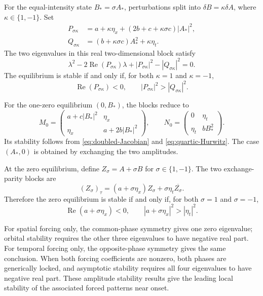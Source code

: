 For the equal-intensity state $B_*=\sigma A_*$, perturbations split into
$\delta B=\kappa\delta A$, where $\kappa\in\{1,-1\}$.  Set
\begin{align}
 P_{\sigma\kappa}
 &=a+\kappa\eta_x+
   \left(2b+c+\kappa\sigma c\right)|A_*|^2,
 \label{eq:P-parity}\\
 Q_{\sigma\kappa}
 &=\left(b+\kappa\sigma c\right)A_*^2+\kappa\eta_t.
 \label{eq:Q-parity}
\end{align}
The two eigenvalues in this real two-dimensional block satisfy
\begin{equation}
 \lambda^2-2\operatorname{Re}(P_{\sigma\kappa})\lambda
 +|P_{\sigma\kappa}|^2-|Q_{\sigma\kappa}|^2=0.
 \label{eq:parity-characteristic}
\end{equation}
The equilibrium is stable if and only if, for both $\kappa=1$ and
$\kappa=-1$,
\begin{equation}
 \operatorname{Re}(P_{\sigma\kappa})<0,
 \qquad
 |P_{\sigma\kappa}|^2>|Q_{\sigma\kappa}|^2.
 \label{eq:parity-stability}
\end{equation}

For the one-zero equilibrium $(0,B_*)$, the blocks reduce to
\begin{equation}
 M_0=
 \begin{pmatrix}
  a+c|B_*|^2&\eta_x\\
  \eta_x&a+2b|B_*|^2
 \end{pmatrix},
 \qquad
 N_0=
 \begin{pmatrix}
  0&\eta_t\\
  \eta_t&bB_*^2
 \end{pmatrix}.
 \label{eq:one-zero-blocks}
\end{equation}
Its stability follows from \eqref{eq:doubled-Jacobian} and
\eqref{eq:quartic-Hurwitz}.  The case $(A_*,0)$ is obtained by exchanging the
two amplitudes.

At the zero equilibrium, define $Z_\sigma=A+\sigma B$ for
$\sigma\in\{1,-1\}$.  The two exchange-parity blocks are
\begin{equation}
 (Z_\sigma)_\tau
 =(a+\sigma\eta_x)Z_\sigma
  +\sigma\eta_t\overline{Z_\sigma}.
 \label{eq:zero-parity-block}
\end{equation}
Therefore the zero equilibrium is stable if and only if, for both
$\sigma=1$ and $\sigma=-1$,
\begin{equation}
 \operatorname{Re}(a+\sigma\eta_x)<0,
 \qquad
 |a+\sigma\eta_x|^2>|\eta_t|^2.
 \label{eq:zero-stability}
\end{equation}

For spatial forcing only, the common-phase symmetry gives one zero
eigenvalue; orbital stability requires the other three eigenvalues to have
negative real part.  For temporal forcing only, the opposite-phase symmetry
gives the same conclusion.  When both forcing coefficients are nonzero, both
phases are generically locked, and asymptotic stability requires all four
eigenvalues to have negative real part.  These amplitude stability results
give the leading local stability of the associated forced patterns near
onset.
